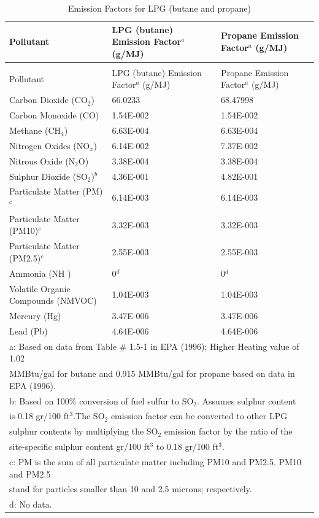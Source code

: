 \begin{longtable}[c]{p{3.0in}p{1.5in}p{1.5in}}
\caption{Emission Factors for LPG (butane and propane) \label{table:emission-factors-for-lpg-butane-and-propane}} \tabularnewline
\toprule
Pollutant & LPG (butane) Emission Factor\(^a\)    (g/MJ) & Propane Emission Factor\(^a\)    (g/MJ) \tabularnewline
\midrule
\endfirsthead

\caption[]{Emission Factors for LPG (butane and propane)} \tabularnewline
\toprule
Pollutant & LPG (butane) Emission Factor\(^a\)    (g/MJ) & Propane Emission Factor\(^a\)    (g/MJ) \tabularnewline
\midrule
\endhead

Carbon Dioxide (CO\(_2\)) & 66.0233 & 68.47998 \tabularnewline
Carbon Monoxide (CO) & 1.54E-002 & 1.54E-002 \tabularnewline
Methane (CH\(_4\)) & 6.63E-004 & 6.63E-004 \tabularnewline
Nitrogen Oxides (NO\(_x\)) & 6.14E-002 & 7.37E-002 \tabularnewline
Nitrous Oxide (N\(_2\)O) & 3.38E-004 & 3.38E-004 \tabularnewline
Sulphur Dioxide (SO\(_2\))\(^b\) & 4.36E-001 & 4.82E-001 \tabularnewline
Particulate Matter (PM)\(^c\) & 6.14E-003 & 6.14E-003 \tabularnewline
Particulate Matter (PM10)\(^c\) & 3.32E-003 & 3.32E-003 \tabularnewline
Particulate Matter (PM2.5)\(^c\) & 2.55E-003 & 2.55E-003 \tabularnewline
Ammonia (NH  ) & 0\(^d\) & 0\(^d\) \tabularnewline
Volatile Organic Compounds (NMVOC) & 1.04E-003 & 1.04E-003 \tabularnewline
Mercury (Hg) & 3.47E-006 & 3.47E-006 \tabularnewline
Lead (Pb) & 4.64E-006 & 4.64E-006 \tabularnewline
\midrule
\multicolumn{3}{l}{a: Based on data from Table \# 1.5-1 in EPA (1996); Higher Heating value of 1.02} \tabularnewline
\multicolumn{3}{l}{MMBtu/gal for butane and 0.915 MMBtu/gal for propane based on data in EPA (1996).} \tabularnewline
\multicolumn{3}{l}{b: Based on 100\% conversion of fuel sulfur to SO\(_2\). Assumes sulphur content} \tabularnewline
\multicolumn{3}{l}{is 0.18 gr/100 ft\(^3\).The SO\(_2\) emission factor can be converted to other LPG} \tabularnewline
\multicolumn{3}{l}{sulphur contents by multiplying the SO\(_2\) emission factor by the ratio of the} \tabularnewline
\multicolumn{3}{l}{site-specific sulphur content gr/100 ft\(^3\) to 0.18 gr/100 ft\(^3\).} \tabularnewline
\multicolumn{3}{l}{c: PM is the sum of all particulate matter including PM10 and PM2.5. PM10 and PM2.5} \tabularnewline
\multicolumn{3}{l}{stand for particles smaller than 10 and 2.5 microns; respectively.} \tabularnewline
\multicolumn{3}{l}{d: No data.} \tabularnewline
\bottomrule
\end{longtable}

